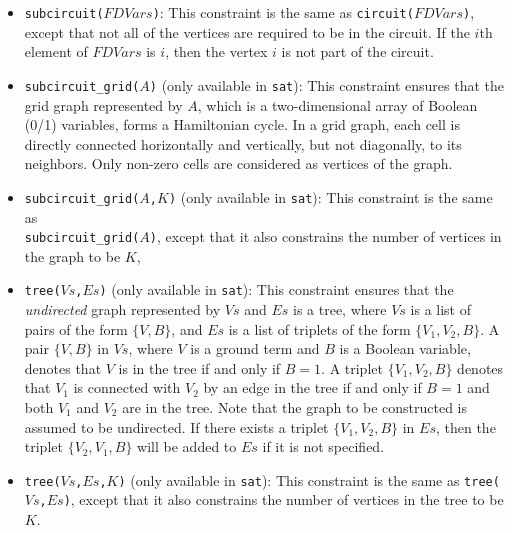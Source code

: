 \begin{itemize}
\item \texttt{subcircuit($FDVars$)}: This constraint is the same as \texttt{circuit($FDVars$)}, except that not all of the vertices are required to be in the circuit. If the $i$th element of $FDVars$ is $i$, then the vertex $i$ is not part of the circuit. 

\item \texttt{subcircuit\_grid($A$)} (only available in \texttt{sat}): This constraint ensures that the grid graph represented by $A$, which is a two-dimensional array of Boolean (0/1) variables, forms a Hamiltonian cycle. In a grid graph, each cell is directly connected horizontally and vertically, but not diagonally, to its neighbors. Only non-zero cells are considered as vertices of the graph.

\item \texttt{subcircuit\_grid($A$,$K$)} (only available in \texttt{sat}): This constraint is the same as \\\texttt{subcircuit\_grid($A$)}, except that it also constrains the number of vertices in the graph to be $K$, 

\item \texttt{tree($Vs$,$Es$)} (only available in \texttt{sat}): This constraint ensures that the \textit{undirected} graph represented by $Vs$ and $Es$ is a tree, where $Vs$ is a list of pairs of the form $\{V,B\}$, and $Es$ is a list of triplets of the form $\{V_1,V_2,B\}$. A pair $\{V,B\}$ in $Vs$, where $V$ is a ground term and $B$ is a Boolean variable, denotes that $V$ is in the tree if and only if $B = 1$. A triplet $\{V_1,V_2,B\}$ denotes that $V_1$ is connected with $V_2$  by an edge in the tree if and only if $B = 1$ and both $V_1$ and $V_2$ are in the tree. Note that the graph to be constructed is assumed to be undirected. If there exists a triplet $\{V_1,V_2,B\}$ in $Es$, then the triplet $\{V_2,V_1,B\}$ will be added to $Es$ if it is not specified.

\item \texttt{tree($Vs$,$Es$,$K$)} (only available in \texttt{sat}):  This constraint is the same as \texttt{tree($Vs$,$Es$)}, except that it also constrains the number of vertices in the tree to be $K$. 
\end{itemize}

